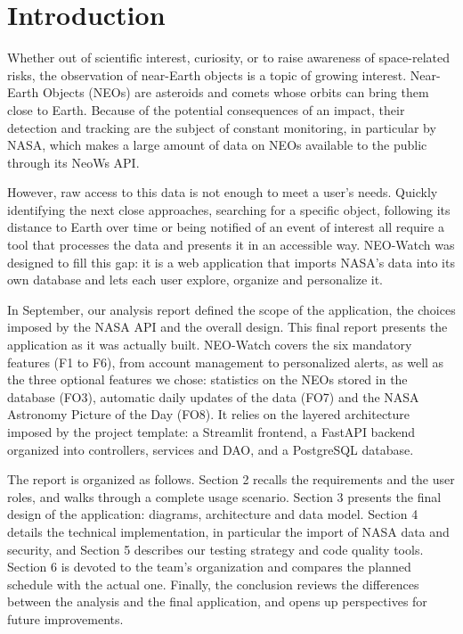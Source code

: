 \section{Introduction}

Whether out of scientific interest, curiosity, or to raise awareness of space-related risks, the observation of near-Earth objects is a topic of growing interest. Near-Earth Objects (NEOs) are asteroids and comets whose orbits can bring them close to Earth. Because of the potential consequences of an impact, their detection and tracking are the subject of constant monitoring, in particular by NASA, which makes a large amount of data on NEOs available to the public through its NeoWs API.

However, raw access to this data is not enough to meet a user's needs. Quickly identifying the next close approaches, searching for a specific object, following its distance to Earth over time or being notified of an event of interest all require a tool that processes the data and presents it in an accessible way. NEO-Watch was designed to fill this gap: it is a web application that imports NASA's data into its own database and lets each user explore, organize and personalize it.

In September, our analysis report defined the scope of the application, the choices imposed by the NASA API and the overall design. This final report presents the application as it was actually built. NEO-Watch covers the six mandatory features (F1 to F6), from account management to personalized alerts, as well as the three optional features we chose: statistics on the NEOs stored in the database (FO3), automatic daily updates of the data (FO7) and the NASA Astronomy Picture of the Day (FO8). It relies on the layered architecture imposed by the project template: a Streamlit frontend, a FastAPI backend organized into controllers, services and DAO, and a PostgreSQL database.

The report is organized as follows. Section 2 recalls the requirements and the user roles, and walks through a complete usage scenario. Section 3 presents the final design of the application: diagrams, architecture and data model. Section 4 details the technical implementation, in particular the import of NASA data and security, and Section 5 describes our testing strategy and code quality tools. Section 6 is devoted to the team's organization and compares the planned schedule with the actual one. Finally, the conclusion reviews the differences between the analysis and the final application, and opens up perspectives for future improvements.
